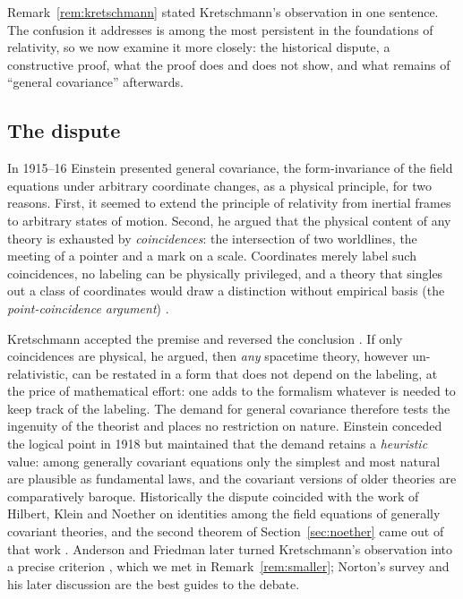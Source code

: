 \documentclass[11pt,a4paper,openany]{book}
\theoremstyle{definition}
\theoremstyle{plain}
\theoremstyle{remark}
\begin{document}
Remark~\ref{rem:kretschmann} stated Kretschmann's observation in one
sentence. The confusion it addresses is among the most persistent in the
foundations of relativity, so we now examine it more closely: the historical
dispute, a constructive proof, what the proof does and does not show, and what
remains of ``general covariance'' afterwards.

\subsection{The dispute}

In 1915--16 Einstein presented general covariance, the form-invariance of the
field equations under arbitrary coordinate changes, as a physical principle,
for two reasons. First, it seemed to extend the principle of relativity from
inertial frames to arbitrary states of motion. Second, he argued that the
physical content of any theory is exhausted by \emph{coincidences}: the
intersection of two worldlines, the meeting of a pointer and a mark on a
scale. Coordinates merely label such coincidences, no labeling can be
physically privileged, and a theory that singles out a class of coordinates
would draw a distinction without empirical basis (the \emph{point-coincidence
argument}) \cite{norton}.

Kretschmann accepted the premise and reversed the conclusion
\cite{kretschmann}. If only coincidences are physical, he argued, then
\emph{any} spacetime theory, however un-relativistic, can be restated in a form
that does not depend on the labeling, at the price of mathematical effort: one
adds to the formalism whatever is needed to keep track of the labeling. The
demand for general covariance therefore tests the ingenuity of the theorist and
places no restriction on nature. Einstein conceded the logical point in 1918
\cite{einstein1918} but maintained that the demand retains a \emph{heuristic}
value: among generally covariant equations only the simplest and most natural
are plausible as fundamental laws, and the covariant versions of older theories
are comparatively baroque. Historically the dispute coincided with the work of
Hilbert, Klein and Noether on identities among the field equations of
generally covariant theories, and the second theorem of
Section~\ref{sec:noether} came out of that work \cite{ks}. Anderson and
Friedman later turned Kretschmann's observation into a precise criterion
\cite{anderson,friedman}, which we met in Remark~\ref{rem:smaller}; Norton's
survey \cite{norton} and his later discussion \cite{bc} are the best guides to
the debate.
\end{document}
